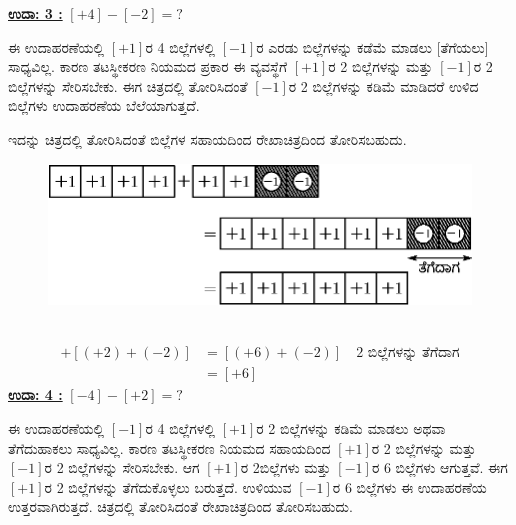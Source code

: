 \noindent
{\textbf{\underline{ಉದಾ: 3 :}}} $[+4] - [-2] = ?$

ಈ ಉದಾಹರಣೆಯಲ್ಲಿ $[+1]$ರ 4 ಬಿಲ್ಲೆಗಳಲ್ಲಿ $[-1]$ರ ಎರಡು ಬಿಲ್ಲೆಗಳನ್ನು ಕಡೆಮೆ ಮಾಡಲು [ತೆಗೆಯಲು] ಸಾಧ್ಯವಿಲ್ಲ. ಕಾರಣ ತಟಸ್ಥೀಕರಣ ನಿಯಮದ ಪ್ರಕಾರ ಈ ವ್ಯವಸ್ಥೆಗೆ $[+1]$ರ 2 ಬಿಲ್ಲೆಗಳನ್ನು ಮತ್ತು $[-1]$ರ 2 ಬಿಲ್ಲೆಗಳನ್ನು ಸೇರಿಸಬೇಕು. ಈಗ ಚಿತ್ರದಲ್ಲಿ ತೋರಿಸಿದಂತೆ $[-1]$ರ 2 ಬಿಲ್ಲೆಗಳನ್ನು ಕಡಿಮೆ ಮಾಡಿದರೆ ಉಳಿದ ಬಿಲ್ಲೆಗಳು ಉದಾಹರಣೆಯ ಬೆಲೆಯಾಗುತ್ತದೆ. 

ಇದನ್ನು ಚಿತ್ರದಲ್ಲಿ ತೋರಿಸಿದಂತೆ ಬಿಲ್ಲೆಗಳ ಸಹಾಯದಿಂದ ರೇಖಾಚಿತ್ರದಿಂದ ತೋರಿಸಬಹುದು. 
\begin{figure}[H]
\centering
\includegraphics[scale=0.8]{src/figure/chap3/fig3-14b.eps}
\end{figure}
~
\vskip -1.5cm
\begin{align*}
[+4]+[(+2)+(-2)] &= [(+6)+(-2)]\quad \text{2 ಬಿಲ್ಲೆಗಳನ್ನು ತೆಗೆದಾಗ}\\
                 &= [+6]
\end{align*}
\noindent
{\textbf{\underline{ಉದಾ: 4 :}}} $[-4] - [+2] = ?$

ಈ ಉದಾಹರಣೆಯಲ್ಲಿ $[-1]$ರ 4 ಬಿಲ್ಲೆಗಳಲ್ಲಿ $[+1]$ರ 2 ಬಿಲ್ಲೆಗಳನ್ನು ಕಡಿಮೆ ಮಾಡಲು ಅಥವಾ ತೆಗೆದುಹಾಕಲು ಸಾಧ್ಯವಿಲ್ಲ. ಕಾರಣ ತಟಸ್ಥೀಕರಣ ನಿಯಮದ ಸಹಾಯದಿಂದ $[+1]$ರ 2 ಬಿಲ್ಲೆಗಳನ್ನು ಮತ್ತು $[-1]$ರ 2 ಬಿಲ್ಲೆಗಳನ್ನು ಸೇರಿಸಬೇಕು. ಆಗ $[+1]$ರ 2\break ಬಿಲ್ಲೆಗಳು ಮತ್ತು $[-1]$ರ 6 ಬಿಲ್ಲೆಗಳು ಆಗುತ್ತವೆ. ಈಗ $[+1]$ರ 2 ಬಿಲ್ಲೆಗಳನ್ನು ತೆಗೆದುಕೊಳ್ಳಲು ಬರುತ್ತದೆ. ಉಳಿಯುವ $[-1]$ರ 6 ಬಿಲ್ಲೆಗಳು ಈ ಉದಾಹರಣೆಯ ಉತ್ತರವಾಗಿರುತ್ತದೆ. ಚಿತ್ರದಲ್ಲಿ ತೋರಿಸಿದಂತೆ ರೇಖಾಚಿತ್ರದಿಂದ ತೋರಿಸಬಹುದು.

